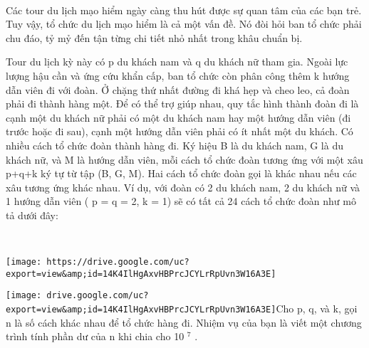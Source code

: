  

Các tour du lịch mạo hiểm ngày càng thu hút được sự quan tâm của các bạn trẻ. Tuy vậy, tổ chức du lịch mạo hiểm là cả một vấn đề. Nó đòi hỏi ban tổ chức phải chu đáo, tỷ mỷ đến tận từng chi tiết nhỏ nhất trong khâu chuẩn bị.

Tour du lịch kỳ này có p du khách nam và q du khách nữ tham gia. Ngoài lực lượng hậu cần và ứng cứu khẩn cấp, ban tổ chức còn phân công thêm k hướng dẫn viên đi với đoàn. Ở chặng thứ nhất đường đi khá hẹp và cheo leo, cả đoàn phải đi thành hàng một. Để có thể trợ giúp nhau, quy tắc hình thành đoàn đi là cạnh một du khách nữ phải có một du khách nam hay một hướng dẫn viên (đi trước hoặc đi sau), cạnh một hướng dẫn viên phải có ít nhất một du khách. Có nhiều cách tổ chức đoàn thành hàng đi. Ký hiệu B là du khách nam, G là du khách nữ, và M là hướng dẫn viên, mỗi cách tổ chức đoàn tương ứng với một xâu p+q+k ký tự từ tập (B, G, M). Hai cách tổ chức đoàn gọi là khác nhau nếu các xâu tương ứng khác nhau. Ví dụ, với đoàn có 2 du khách nam, 2 du khách nữ và 1 hướng dẫn viên ( p = q = 2, k = 1) sẽ có tất cả 24 cách tổ chức đoàn như mô tả dưới đây:

 


\texttt{[image: https://drive.google.com/uc?export=view\&amp;id=14K4IlHgAxvHBPrcJCYLrRpUvn3W16A3E]}


\texttt{[image: drive.google.com/uc?export=view\&amp;id=14K4IlHgAxvHBPrcJCYLrRpUvn3W16A3E]}Cho p, q, và k, gọi n là số cách khác nhau để tổ chức hàng đi. Nhiệm vụ của bạn là viết một chương trình tính phần dư của n khi chia cho 10 $^ 7 $ .